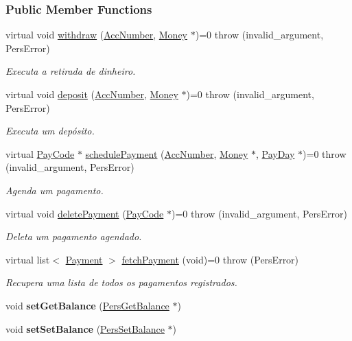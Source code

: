 \subsubsection*{Public Member Functions}
\begin{DoxyCompactItemize}
\item 
virtual void \hyperlink{classTransacAdm_a128750caeeec2cd48a4a01e6ce9f701c}{withdraw} (\hyperlink{classAccNumber}{Acc\-Number}, \hyperlink{classMoney}{Money} $\ast$)=0  throw (invalid\-\_\-argument, Pers\-Error)
\begin{DoxyCompactList}\small\item\em Executa a retirada de dinheiro. \end{DoxyCompactList}\item 
virtual void \hyperlink{classTransacAdm_a9b6ffc8a521600094eb13510edcb33d7}{deposit} (\hyperlink{classAccNumber}{Acc\-Number}, \hyperlink{classMoney}{Money} $\ast$)=0  throw (invalid\-\_\-argument, Pers\-Error)
\begin{DoxyCompactList}\small\item\em Executa um depósito. \end{DoxyCompactList}\item 
virtual \hyperlink{classPayCode}{Pay\-Code} $\ast$ \hyperlink{classTransacAdm_a6f350bc661f1a6460a31a0b02ccb8d3f}{schedule\-Payment} (\hyperlink{classAccNumber}{Acc\-Number}, \hyperlink{classMoney}{Money} $\ast$, \hyperlink{classPayDay}{Pay\-Day} $\ast$)=0  throw (invalid\-\_\-argument, Pers\-Error)
\begin{DoxyCompactList}\small\item\em Agenda um pagamento. \end{DoxyCompactList}\item 
virtual void \hyperlink{classTransacAdm_a76f27b0fc9e604695c4c601839d3b441}{delete\-Payment} (\hyperlink{classPayCode}{Pay\-Code} $\ast$)=0  throw (invalid\-\_\-argument, Pers\-Error)
\begin{DoxyCompactList}\small\item\em Deleta um pagamento agendado. \end{DoxyCompactList}\item 
virtual list$<$ \hyperlink{classPayment}{Payment} $>$ \hyperlink{classTransacAdm_ab3c02884c14540c1f520339581e88371}{fetch\-Payment} (void)=0  throw (\-Pers\-Error)
\begin{DoxyCompactList}\small\item\em Recupera uma lista de todos os pagamentos registrados. \end{DoxyCompactList}\item 
\hypertarget{classTransacAdm_a618e67e64948b4e81857bf32446c02ba}{void {\bfseries set\-Get\-Balance} (\hyperlink{classPersGetBalance}{Pers\-Get\-Balance} $\ast$)}\label{da/deb/classTransacAdm_a618e67e64948b4e81857bf32446c02ba}

\item 
\hypertarget{classTransacAdm_a27e93efe0101fcf9f569f4b900a38f91}{void {\bfseries set\-Set\-Balance} (\hyperlink{classPersSetBalance}{Pers\-Set\-Balance} $\ast$)}\label{da/deb/classTransacAdm_a27e93efe0101fcf9f569f4b900a38f91}

\end{DoxyCompactItemize}


